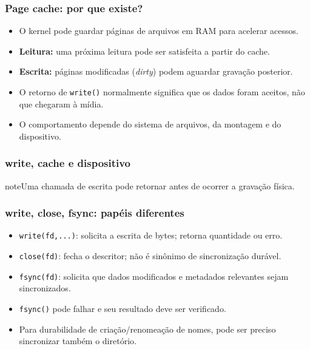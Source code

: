 \documentclass[aspectratio=169,11pt]{beamer}
\begin{document}
\begin{frame}
\frametitle{Page cache: por que existe?}
\large
\begin{itemize}
\item O kernel pode guardar páginas de arquivos em RAM para acelerar acessos.
\item \textbf{Leitura:} uma próxima leitura pode ser satisfeita a partir do cache.
\item \textbf{Escrita:} páginas modificadas (\textit{dirty}) podem aguardar gravação posterior.
\item O retorno de \texttt{write()} normalmente significa que os dados foram aceitos, não que chegaram à mídia.
\item O comportamento depende do sistema de arquivos, da montagem e do dispositivo.
\end{itemize}

\end{frame}

\begin{frame}
\frametitle{write, cache e dispositivo}
\begin{center}\end{center}
\vfill\begin{beamercolorbox}[wd=\textwidth,sep=2mm,rounded=true]{note}\small Uma chamada de escrita pode retornar antes de ocorrer a gravação física.\end{beamercolorbox}
\end{frame}

\begin{frame}
\frametitle{write, close, fsync: papéis diferentes}
\large
\begin{itemize}
\item \texttt{write(fd,...)}: solicita a escrita de bytes; retorna quantidade ou erro.
\item \texttt{close(fd)}: fecha o descritor; não é sinônimo de sincronização durável.
\item \texttt{fsync(fd)}: solicita que dados modificados e metadados relevantes sejam sincronizados.
\item \texttt{fsync()} pode falhar e seu resultado deve ser verificado.
\item Para durabilidade de criação/renomeação de nomes, pode ser preciso sincronizar também o diretório.
\end{itemize}

\end{frame}
\end{document}
